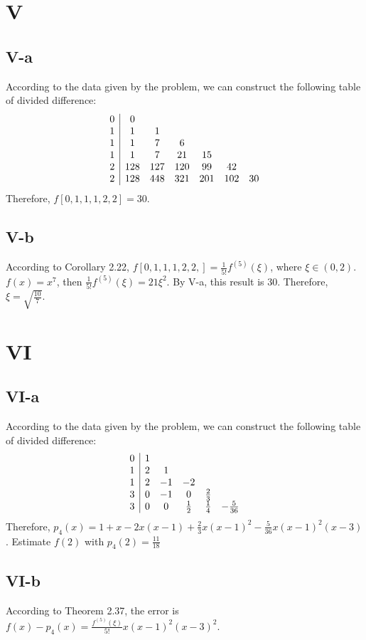 \documentclass[a4paper]{article}
\begin{document}
\section*{V}
\subsection*{V-a}
According to the data given by the problem, we can construct the following table of divided difference:
$$
\begin{array}{c|c c c c c c}
  0 & 0 \\
  1 & 1 & 1 \\
  1 & 1 & 7 & 6 \\
  1 & 1 & 7 & 21 & 15 \\
  2 & 128 & 127 & 120 & 99 & 42 \\
  2 & 128 & 448 & 321 & 201 & 102 & 30
\end{array}
$$
Therefore, $f[0,1,1,1,2,2] = 30$.

\subsection*{V-b}
According to Corollary 2.22, $f[0,1,1,1,2,2,] = \frac{1}{5!}f^{(5)}(\xi)$, where $\xi \in (0,2)$. $f(x) = x^7$, then $\frac{1}{5!}f^{(5)}(\xi) = 21\xi^2$. By V-a, this result is 30. 
Therefore, $\xi = \sqrt{\frac{10}{7}}$.

\section*{VI}
\subsection*{VI-a}
According to the data given by the problem, we can construct the following table of divided difference:
$$
\begin{array}{c|c c c c c}
  0 & 1 \\
  1 & 2 & 1 \\
  1 & 2 & -1 & -2 \\
  3 & 0 & -1 & 0 & \frac{2}{3} \\
  3 & 0 & 0 & \frac{1}{2} & \frac{1}{4} & -\frac{5}{36}
\end{array}
$$
Therefore, $p_4(x) = 1 + x -2x(x-1) + \frac{2}{3}x(x-1)^2 - \frac{5}{36}x(x-1)^2(x-3)$. Estimate $f(2)$ with $p_4(2) = \frac{11}{18}$

\subsection*{VI-b}
According to Theorem 2.37, the error is $f(x) - p_4(x) = \frac{f^{(5)}(\xi)}{5!}x(x-1)^2(x-3)^2$.
\end{document}
